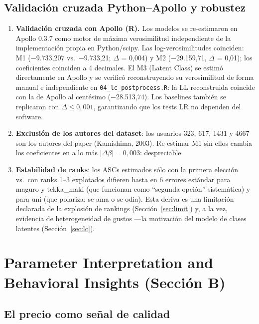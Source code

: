 \documentclass[12pt,a4paper]{article}
\begin{document}
\subsection{Validación cruzada Python--Apollo y robustez}
\label{sec:robust}

\begin{enumerate}[nosep]
  \item \textbf{Validación cruzada con Apollo (R).} Los modelos se re-estimaron en Apollo 0.3.7 como motor de máxima verosimilitud independiente de la implementación propia en Python/scipy. Las log-verosimilitudes coinciden: M1 ($-$9.733,207 vs.\ $-$9.733,21; $\Delta$ = 0,004) y M2 ($-$29.159,71, $\Delta$ = 0,01); los coeficientes coinciden a 4 decimales. El M3 (Latent Class) se estimó directamente en Apollo y se verificó reconstruyendo su verosimilitud de forma manual e independiente en \texttt{04\_lc\_postprocess.R}: la LL reconstruida coincide con la de Apollo al centésimo ($-$28.513,74). Los baselines también se replicaron con $\Delta \leq 0{,}001$, garantizando que los tests LR no dependen del software.
  \item \textbf{Exclusión de los autores del dataset}: los usuarios 323, 617, 1431 y 4667 son los autores del paper (Kamishima, 2003). Re-estimar M1 sin ellos cambia los coeficientes en a lo más $|\Delta\beta| = 0{,}003$: despreciable.
  \item \textbf{Estabilidad de ranks}: los ASCs estimados sólo con la primera elección vs.\ con ranks 1--3 explotados difieren hasta en 6 errores estándar para maguro y tekka\_maki (que funcionan como ``segunda opción'' sistemática) y para uni (que polariza: se ama o se odia). Esta deriva es una limitación declarada de la explosión de rankings (Sección~\ref{sec:limit}) y, a la vez, evidencia de heterogeneidad de gustos ---la motivación del modelo de clases latentes (Sección~\ref{sec:lc}).
\end{enumerate}

\section{Parameter Interpretation and Behavioral Insights (Sección B)}
\label{sec:B}

\subsection{El precio como señal de calidad}
\label{sec:price_quality}
\end{document}
